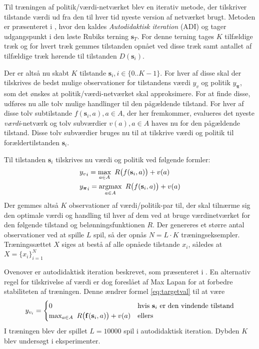 \documentclass[../main.tex]{subfiles}
\begin{document}
Til træningen af politik/værdi-netværket blev en iterativ metode, der tilskriver tilstande værdi ud fra den til hver tid nyeste version af netværket brugt. 
Metoden er præsenteret i \cite[4.1]{HumansBeGone}, hvor den kaldes \textit{Autodidaktisk iteration} (ADI) og tager udgangspunkt i den løste Rubiks terning \(\mathbf s_T\).
For denne terning tages \(K\) tilfældige træk og for hvert træk gemmes tilstanden opnået ved disse træk samt antallet af tilfældige træk hørende til tilstanden \(D(\mathbf s_i)\). 

Der er altså nu skabt \(K\) tilstande \(\mathbf{s}_{i}, i\in\{0..K-1\}\). For hver af disse skal der tilskrives de bedst mulige observationer for tilstandens værdi \(y_v\) og politik \(y_{\bm \pi }\), som det ønskes at politik/værdi-netværket skal approksimere.
For at finde disse, udføres nu alle tolv mulige handlinger til den pågældende tilstand. For hver af disse tolv subtilstande \(f(\mathbf s_i, a), a\in A\), der her fremkommer, evalueres det nyeste \textit{værdi}-netværk og tolv subværdier \(v(a), a\in A\) haves nu for den pågældende tilstand.
Disse tolv subværdier bruges nu til at tilskrive værdi og politik til forældertilstanden \(\mathbf s _i\).	 

Til tilstanden \(\mathbf s _i\) tilskrives nu værdi og politik ved følgende formler:
\begin{align}
	&{y_{v}}_i= \operatorname*{max}_{a\in A}\  R\big( f(\mathbf s_i, a)\big)+v(a)\label{eq:targetval}
	\\
	& {y_{\bm \pi }}_i = \operatorname*{argmax}_{a\in A} \  R\big( f(\mathbf s_i, a)\big)+v(a) \label{eq:targetpi}
\end{align}
Der gemmes altså \(K\) observationer af værdi/politik-par til, der skal tilnærme sig den optimale værdi og handling til hver af dem ved at bruge værdinetværket for den følgende tilstand og belønningsfunktionen \(R\). 
Der genereres et større antal observationer ved at spille \(L\) spil, så der opnås \(N=L\cdot K\) træningseksempler.
Træningssættet $ X $ siges at bestå af alle opnåede tilstande $ x_i $, således at $ X=\{x_i\}_{i=1}^N $

Ovenover er autodidaktisk iteration beskrevet, som præsenteret i \cite{HumansBeGone}. En alternativ regel for tilskrivelse af værdi er dog foreslået af Max Lapan \cite{RubiksMedium} for at forbedre stabiliteten af træningen. Denne ændrer formel \eqref{eq:targetval} til at være
\begin{equation}\label{eq:lapantargeval}
y_{v_i}= 
\begin{cases}
0 & \text{hvis \(\mathbf s_i\) er den vindende tilstand}\\
\operatorname*{max}_{a\in A}\  R\big(\mathbf f(\mathbf s_i, a)\big)+v(a) &\text{ellers}
\end{cases}
\end{equation}
I træningen blev der spillet \(L=10000\) spil i autodidaktisk iteration. Dybden \(K\) blev undersøgt i eksperimenter.
\end{document}

